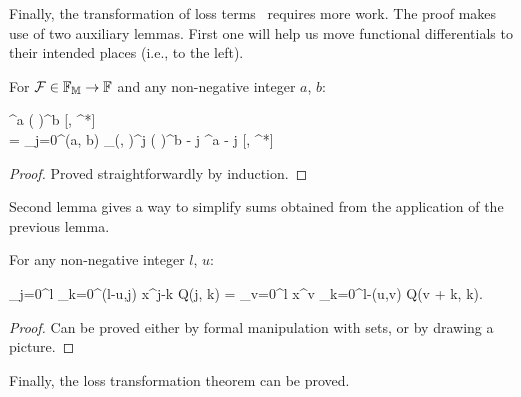 Finally, the transformation of loss terms~ requires more work.
The proof makes use of two auxiliary lemmas.
First one will help us move functional differentials to their intended places (i.e., to the left).

\begin{lemma}
\label{lmm:transformations:swap-differential}
    For $\mathcal{F} \in \mathbb{F}_{\mathbb{M}} \rightarrow \mathbb{F}$ and any non-negative integer $a$, $b$:
    \begin{eqn*}
    	\Psi^a \left( \frac{\delta}{\delta \Psi} \right)^b [\Psi, \Psi^*] \\
    	= \sum_{j=0}^{\min(a, b)}
    		 
    		\delta_{\restbasis}(\xvec, \xvec)^j
    		\left( \frac{\delta}{\delta \Psi} \right)^{b - j}
    		\Psi^{a - j}
    		[\Psi, \Psi^*]
    \end{eqn*}
\end{lemma}
\begin{proof}
Proved straightforwardly by induction.
\end{proof}

Second lemma gives a way to simplify sums obtained from the application of the previous lemma.

\begin{lemma}
\label{lmm:transformations:sum-rearrangement}
    For any non-negative integer $l$, $u$:
    \begin{eqn*}
    	\sum_{j=0}^l \sum_{k=0}^{\min(l-u,j)} x^{j-k} Q(j, k)
    	= \sum_{v=0}^l x^v \sum_{k=0}^{l-\max(u,v)} Q(v + k, k).
    \end{eqn*}
\end{lemma}
\begin{proof}
Can be proved either by formal manipulation with sets, or by drawing a picture.
\end{proof}

Finally, the loss transformation theorem can be proved.

